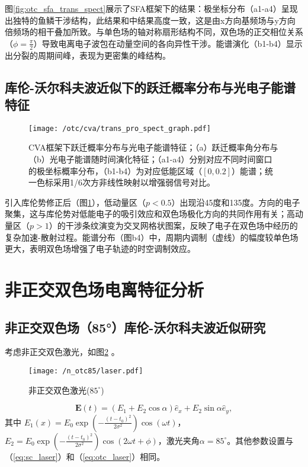 图\ref{fig:otc_sfa_trans_spect}展示了SFA框架下的结果：极坐标分布（a1-a4）呈现出独特的鱼鳞干涉结构，此结果和中结果高度一致，这是由x方向基频场与y方向倍频场的相干叠加所致。与单色场的轴对称扇形结构不同，双色场的正交相位关系（$\phi = \frac{\pi}{2}$）导致电离电子波包在动量空间的各向异性干涉。能谱演化（b1-b4）显示出分裂的周期间峰，表现为更密集的峰结构。

\subsection{库伦-沃尔科夫波近似下的跃迁概率分布与光电子能谱特征}

\begin{figure}[!htpb]  %
	\centering
	\texttt{[image: /otc/cva/trans\_pro\_spect\_graph.pdf]}
	\caption{CVA框架下跃迁概率分布与光电子能谱特征；（a）跃迁概率角分布与（b）光电子能谱随时间演化特征；（a1-a4）分别对应不同时间窗口的极坐标概率分布，（b1-b4）为对应低能区域（$[0, 0.2]$）能谱；统一色标采用1/6次方非线性映射以增强弱信号对比。}
	\label{fig:otc_cva_trans_spect}
\end{figure}

引入库伦势修正后（图\ref{fig:otc_cva_trans_spect}），低动量区（$p<0.5$）出现沿45度和135度。方向的电子聚集，这与库伦势对低能电子的吸引效应和双色场极化方向的共同作用有关；高动量区（$p>1$）的干涉条纹演变为交叉网格状图案，反映了电子在双色场中经历的复杂加速-散射过程。能谱分布（图b4）中，周期内调制（虚线）的幅度较单色场更大，表明双色场增强了电子轨迹的时空调制效应。

%
\section{非正交双色场电离特征分析}
\subsection{非正交双色场（85°）库伦-沃尔科夫波近似研究}

考虑非正交双色激光，如图\ref{fig:n_otc85_laser} 。

\begin{figure}[h]  %
	\centering
	\texttt{[image: /n\_otc85/laser.pdf]}
	\caption{非正交双色激光($85^\circ$)}
	\label{fig:n_otc85_laser}
\end{figure}

\begin{equation}
	\mathbf{E}(t) = \left(E_1 + E_2\cos\alpha\right) \hat e_x + E_2\sin\alpha \hat e_y,
\end{equation}
其中 $E_1(x) = E_0 \exp\left(-\frac{(t - t_0)^2}{2\sigma^2}\right) \cos(\omega t)$，$E_2 = E_0 \exp\left(-\frac{(t - t_0)^2}{2\sigma^2}\right) \cos(2 \omega t + \phi)$，激光夹角$\alpha = 85^\circ$。其他参数设置与（\ref{eq:sc_laser}）和（\ref{eq:otc_laser}）相同。

